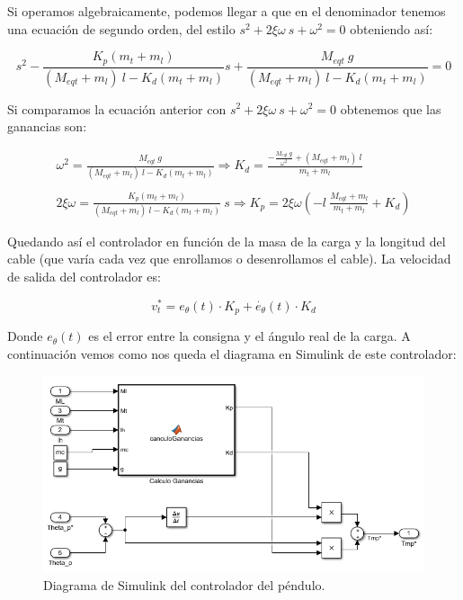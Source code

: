 \documentclass[11pt]{article}
\begin{document}
Si operamos algebraicamente, podemos llegar a que en el denominador tenemos una ecuación de segundo orden, del estilo $s^2+2\xi\omega\ s+\omega^2=0$ obteniendo así:

\begin{equation}
	\label{eq:funcion_transferencia_controlador_2}
	s^2-\frac{K_p(m_t+m_l)}{(M_{eqt}+m_l)\ l-K_d(m_t+m_l)}s+\frac{M_{eqt}\ g}{(M_{eqt}+m_l)\ l-K_d(m_t+m_l)}=0
\end{equation}

Si comparamos la ecuación anterior con $s^2+2\xi\omega\ s+\omega^2=0$ obtenemos que las ganancias son:

\begin{equation}
	\label{eq:ganancias}
	\begin{matrix}\omega ^{2}=\frac{M_{eqt}\:g}{(M_{eqt}+m_l)\:l-K_d(m_t+m_l)}\Rightarrow K_d=\frac{-\frac{M_{eqt}\:g}{\omega^{2}}+(M_{eqt}+m_l)\:l}{m_t+m_l}\\ \\2\xi \omega =\frac{K_p(m_t+m_l)}{(M_{eqt}+m_l)\:l-K_d(m_t+m_l)}\:s\Rightarrow K_p=2\xi \omega\left ( -l\:\frac{M_{eqt}+m_l}{m_t+m_l}+K_d \right )\end{matrix}
\end{equation}

Quedando así el controlador en función de la masa de la carga y la longitud del cable (que varía cada vez que enrollamos o desenrollamos el cable). La velocidad de salida del controlador es:

\begin{equation}
	\label{eq:velocidad_salida_controlador}
	v_t^{*}=e_\theta(t)\cdot K_p+\dot{e_{\theta}}(t)\cdot K_d
\end{equation}

Donde $e_\theta(t)$ es el error entre la consigna y el ángulo real de la carga. A continuación vemos como nos queda el diagrama en Simulink de este controlador:

\begin{figure}[h!]
	\centering
	\includegraphics[width=1\textwidth]{images/imagen_15_controlador_pendulo.png}
	\caption{Diagrama de Simulink del controlador del péndulo.}
	\label{fig:controlador_pendulo}
\end{figure}
\end{document}
